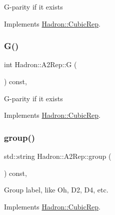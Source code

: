 G-\/parity if it exists 

Implements \mbox{\hyperlink{structHadron_1_1CubicRep_a52104e43266d1614c00bbd1c3b395458}{Hadron\+::\+Cubic\+Rep}}.

\mbox{\label{structHadron_1_1A2Rep_a6c2da481eeb98634c640e8f17a569eea}} 
\subsubsection{\texorpdfstring{G()}{G()}\hspace{0.1cm}{\footnotesize\ttfamily [2/2]}}
{\footnotesize\ttfamily int Hadron\+::\+A2\+Rep\+::G (\begin{DoxyParamCaption}{ }\end{DoxyParamCaption}) const\hspace{0.3cm}{\ttfamily [inline]}, {\ttfamily [virtual]}}

G-\/parity if it exists 

Implements \mbox{\hyperlink{structHadron_1_1CubicRep_a52104e43266d1614c00bbd1c3b395458}{Hadron\+::\+Cubic\+Rep}}.

\mbox{\label{structHadron_1_1A2Rep_a3bc9b6dc8fcd507991dfc7dbad16e7a4}} 
\subsubsection{\texorpdfstring{group()}{group()}\hspace{0.1cm}{\footnotesize\ttfamily [1/2]}}
{\footnotesize\ttfamily std\+::string Hadron\+::\+A2\+Rep\+::group (\begin{DoxyParamCaption}{ }\end{DoxyParamCaption}) const\hspace{0.3cm}{\ttfamily [inline]}, {\ttfamily [virtual]}}

Group label, like Oh, D2, D4, etc. 

Implements \mbox{\hyperlink{structHadron_1_1CubicRep_a0748f11ec87f387062c8e8981339a29c}{Hadron\+::\+Cubic\+Rep}}.

\mbox{\label{structHadron_1_1A2Rep_a3bc9b6dc8fcd507991dfc7dbad16e7a4}} 
